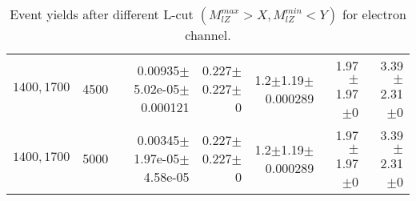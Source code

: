 \documentclass[]{article}
\begin{document}
\begin{table}
\begin{center}
{\begin{tabular}{ |r|r|r|r|r|r|r|}
$1400, 1700$ & 4500 & 0.00935$\pm$5.02e-05$\pm$0.000121 & 0.227$\pm$0.227$\pm$0 & 1.2$\pm$1.19$\pm$0.000289 & 1.97$\pm$1.97$\pm$0 & 3.39$\pm$2.31$\pm$0 \\
$1400, 1700$ & 5000 & 0.00345$\pm$1.97e-05$\pm$4.58e-05 & 0.227$\pm$0.227$\pm$0 & 1.2$\pm$1.19$\pm$0.000289 & 1.97$\pm$1.97$\pm$0 & 3.39$\pm$2.31$\pm$0 \\
\hline 
\end{tabular}
}
\end{center}
\caption{Event yields after different L-cut $(M_{lZ}^{max} > X, M_{lZ}^{min} < Y)$ for electron channel.}
\end{table}
\end{document}

